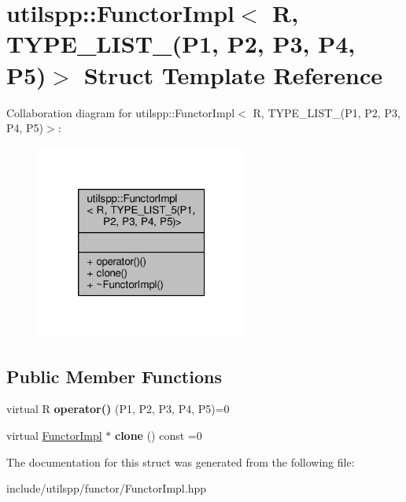 \hypertarget{structutilspp_1_1FunctorImpl_3_01R_00_01TYPE__LIST__5_07P1_00_01P2_00_01P3_00_01P4_00_01P5_08_4}{\section{utilspp\-:\-:Functor\-Impl$<$ R, T\-Y\-P\-E\-\_\-\-L\-I\-S\-T\-\_(P1, P2, P3, P4, P5)$>$ Struct Template Reference}
\label{structutilspp_1_1FunctorImpl_3_01R_00_01TYPE__LIST__5_07P1_00_01P2_00_01P3_00_01P4_00_01P5_08_4}
}


Collaboration diagram for utilspp\-:\-:Functor\-Impl$<$ R, T\-Y\-P\-E\-\_\-\-L\-I\-S\-T\-\_(P1, P2, P3, P4, P5)$>$\-:\nopagebreak
\begin{figure}[H]
\begin{center}
\leavevmode
\includegraphics[width=198pt]{structutilspp_1_1FunctorImpl_3_01R_00_01TYPE__LIST__5_07P1_00_01P2_00_01P3_00_01P4_00_01P5_08_4__coll__graph}
\end{center}
\end{figure}
\subsection*{Public Member Functions}
\begin{DoxyCompactItemize}
\item 
\hypertarget{structutilspp_1_1FunctorImpl_3_01R_00_01TYPE__LIST__5_07P1_00_01P2_00_01P3_00_01P4_00_01P5_08_4_a83f9c9e9bfe329ef441a8d0a1618ba9f}{virtual R {\bfseries operator()} (P1, P2, P3, P4, P5)=0}\label{structutilspp_1_1FunctorImpl_3_01R_00_01TYPE__LIST__5_07P1_00_01P2_00_01P3_00_01P4_00_01P5_08_4_a83f9c9e9bfe329ef441a8d0a1618ba9f}

\item 
\hypertarget{structutilspp_1_1FunctorImpl_3_01R_00_01TYPE__LIST__5_07P1_00_01P2_00_01P3_00_01P4_00_01P5_08_4_a15ef9c58b6d3c813ca31cad2e0a3b52b}{virtual \hyperlink{structutilspp_1_1FunctorImpl}{Functor\-Impl} $\ast$ {\bfseries clone} () const =0}\label{structutilspp_1_1FunctorImpl_3_01R_00_01TYPE__LIST__5_07P1_00_01P2_00_01P3_00_01P4_00_01P5_08_4_a15ef9c58b6d3c813ca31cad2e0a3b52b}

\end{DoxyCompactItemize}


The documentation for this struct was generated from the following file\-:\begin{DoxyCompactItemize}
\item 
include/utilspp/functor/Functor\-Impl.\-hpp\end{DoxyCompactItemize}
